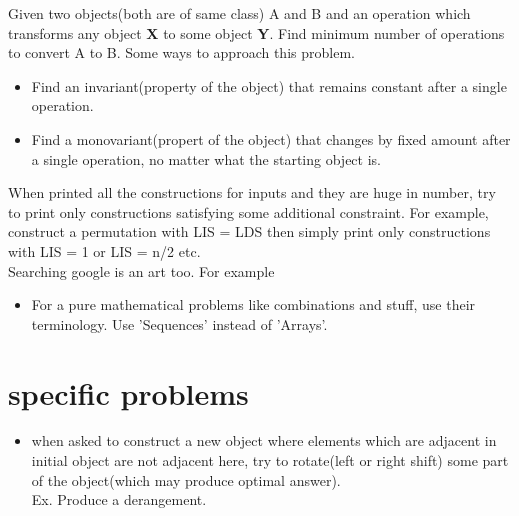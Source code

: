 \documentclass[../Notes.tex]{subfiles}
\begin{document}
Given two objects(both are of same class) A and B and an operation which transforms any object \textbf{X} to some object \textbf{Y}. Find minimum number of operations to convert A to B. Some ways to approach this problem.
\begin{itemize}
	\item Find an invariant(property of the object) that remains constant after a single operation.
	\item Find a monovariant(propert of the object) that changes by fixed amount after a single operation, no matter what the starting object is.
\end{itemize}

When printed all the constructions for inputs and they are huge in number, try to print only constructions satisfying some additional constraint. For example, construct a permutation with LIS = LDS  then simply print only constructions with LIS = 1 or LIS = n/2 etc.\\

Searching google is an art too. For example
\begin{itemize}
	\item For a pure mathematical problems like combinations and stuff, use their terminology. Use 'Sequences' instead of 'Arrays'.
\end{itemize}

\section{specific problems}
\begin{itemize}
	\item when asked to construct a new object where elements which are adjacent in initial object are not adjacent here, try to rotate(left or right shift) some part of the object(which may produce optimal answer). \\Ex. Produce a derangement.
\end{itemize}
\end{document}
